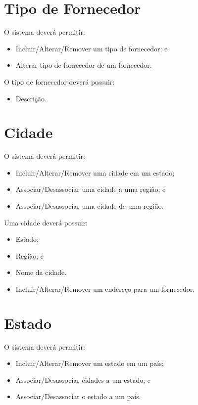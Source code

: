 \section{Tipo de Fornecedor}

O sistema deverá permitir:

\begin{itemize}
	\item Incluir/Alterar/Remover um tipo de fornecedor; e
	\item Alterar tipo de fornecedor de um fornecedor.
\end{itemize}

O tipo de fornecedor deverá possuir:

\begin{itemize}
	\item Descrição.
\end{itemize}

\section{Cidade}

O sistema deverá permitir:

\begin{itemize}
	\item Incluir/Alterar/Remover uma cidade em um estado;
	\item Associar/Desassociar uma cidade a uma região; e
	\item Associar/Desassociar uma cidade de uma região.
\end{itemize}

Uma cidade deverá possuir:

\begin{itemize}
	\item Estado;
	\item Região; e
	\item Nome da cidade.
	\item Incluir/Alterar/Remover um endereço para um fornecedor.
\end{itemize}

\section{Estado}

O sistema deverá permitir:

\begin{itemize}
	\item Incluir/Alterar/Remover um estado em um país;
	\item Associar/Desassociar cidades a um estado; e
	\item Associar/Desassociar o estado a um país.
\end{itemize}

